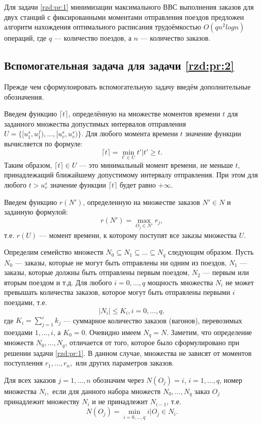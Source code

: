 Для задачи \ref{rzd:pr:1} минимизации максимального ВВС выполнения заказов
для двух станций с фиксированными моментами отправления поездов предложен алгоритм нахождения оптимального расписания трудоёмкостью $O(q n^2 log n)$ операций, где $q$ --- количество поездов, а $n$ --- количество заказов.

\subsection{Вспомогательная задача для задачи \ref{rzd:pr:2}}\label{rzd:sec:aux2:4}
Прежде чем сформулоировать вспомогательную задачу введём дополнительные обозначения.

Введем функцию $\lceil t \rceil$, определённую на множестве моментов времени $t$ для заданного множества допустимых интервалов отправления $U = \{[u^s_1, u^f_1), \dots, [u^s_v, u^s_v)\}$. Для любого момента времени $t$ значение функции вычисляется по формуле:
 $$\lceil t \rceil = \min\limits_{t' \in U} t' | t' \geq t.$$
Таким образом, $\lceil t \rceil \in U$ ---  это минимальный момент времени, не меньше $t$, принадлежащий ближайшему допустимому интервалу отправления.
При этом для любого $t > u^s_v$ значение функции $\lceil t \rceil$ будет равно $+\infty$.

Введем функцию $r(N')$, определенную на множестве заказов $N' \in N$ и заданную формулой:
 $$r(N') = \max\limits_{O_j \in N'}r_j,$$
 т.е. $r(U)$ --- момент времени, к которому поступят все заказы множества $U$.

Определим семейство множеств $N_0 \subseteq N_1 \subseteq \dots \subseteq N_q$ следующим образом. Пусть $N_0$ --- заказы, которые не могут быть отправлены ни одним из поездов, $N_1$ --- заказы, которые должны быть отправлены первым поездом, $N_2$ --- первым или вторым поездом и т.д. Для любого $i = 0,\dots, q$ мощность множества $N_i$ не может превышать количества заказов, которое могут быть отправлены первыми $i$ поездами, т.е.
\begin{equation}\label{rzd:eq:3}
|N_i| \leq K_i, i=0, \dots, q,
\end{equation}
где $K_i = \sum\limits_{j=1}^i k_j$ --- суммарное количество заказов (вагонов), перевозимых поездами $1,\dots, i$, а $K_0 = 0$. Очевидно имеем $N_q = N$.
Заметим, что определение множеств $N_0, \dots, N_q$, отличается от того, которое было сформулировано при решении задачи \ref{rzd:pr:1}. В данном случае, множества не зависят от моментов поступления $r_1, \dots, r_n,$ или других параметров заказов.

Для всех заказов $j=1, \dots, n$ обозначим через $N(O_j) = i$, $i=1, \dots, q$, номер множества $N_i,$ если для данного набора множеств $N_0, \dots, N_q$ заказ $O_j$ принадлежит множеству $N_i$ и не принадлежит $N_{i-1}$, т.е.
$$N(O_j) = \min\limits_{i=0, \dots, q} i | O_j \in N_i.$$

